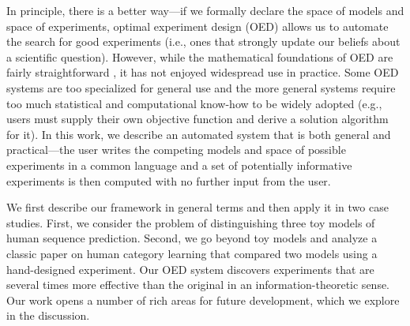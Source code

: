 \documentclass[10pt,letterpaper]{article}
\begin{document}
In principle, there is a better way---if we formally declare the space of models and space of experiments, optimal experiment design (OED) allows us to automate the search for good experiments (i.e., ones that strongly update our beliefs about a scientific question).
However, while the mathematical foundations of OED are fairly straightforward \citep{Lindley1956}, it has not enjoyed widespread use in practice.
Some OED systems are too specialized for general use and the more general systems require too much statistical and computational know-how to be widely adopted (e.g., users must supply their own objective function and derive a solution algorithm for it).
In this work, we describe an automated system that is both general and practical---the user writes the competing models and space of possible experiments in a common language and a set of potentially informative experiments is then computed with no further input from the user.




We first describe our framework in general terms and then apply it in two case studies.
First, we consider the problem of distinguishing three toy models of human sequence prediction.
Second, we go beyond toy models and analyze a classic paper \citep{medin78:pr} on human category learning that compared two models using a hand-designed experiment.
Our OED system discovers experiments that are several times more effective than the original in an information-theoretic sense.
Our work opens a number of rich areas for future development, which we explore in the discussion.
\end{document}
